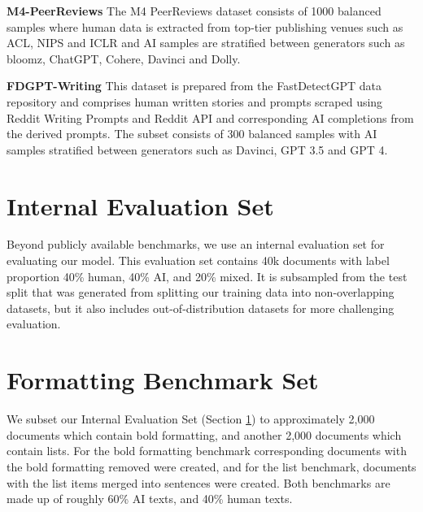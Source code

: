\documentclass[11pt]{article}
\begin{document}


\textbf{M4-PeerReviews} The M4 PeerReviews dataset \cite{wang-etal-2024-m4} consists of 1000 balanced samples where human data is extracted from top-tier publishing venues such as ACL, NIPS and ICLR and AI samples are stratified between generators such as bloomz, ChatGPT, Cohere, Davinci and Dolly. 

\textbf {FDGPT-Writing} This dataset is prepared from the FastDetectGPT \cite{bao2023fast} data repository and comprises human written stories and prompts scraped using Reddit Writing Prompts and Reddit API and corresponding AI completions from the derived prompts. The subset consists of 300 balanced samples with AI samples stratified between generators such as Davinci, GPT 3.5 and GPT 4. 


\section{Internal Evaluation Set}
\label{sec:internal_evaluation_set}
Beyond publicly available benchmarks, we use an internal evaluation set for evaluating our model. This evaluation set contains 40k documents with label proportion 40\% human, 40\% AI, and 20\% mixed. It is subsampled from the test split that was generated from splitting our training data into non-overlapping datasets, but it also includes out-of-distribution datasets for more challenging evaluation. 

\section{Formatting Benchmark Set}
\label{sec:formatting_benchmark_set}
We subset our Internal Evaluation Set (Section \ref{sec:internal_evaluation_set}) to approximately 2,000 documents which contain bold formatting, and another 2,000 documents which contain lists. For the bold formatting benchmark corresponding documents with the bold formatting removed were created, and for the list benchmark, documents with the list items merged into sentences were created. Both benchmarks are made up of roughly 60\% AI texts, and 40\% human texts.
\end{document}
